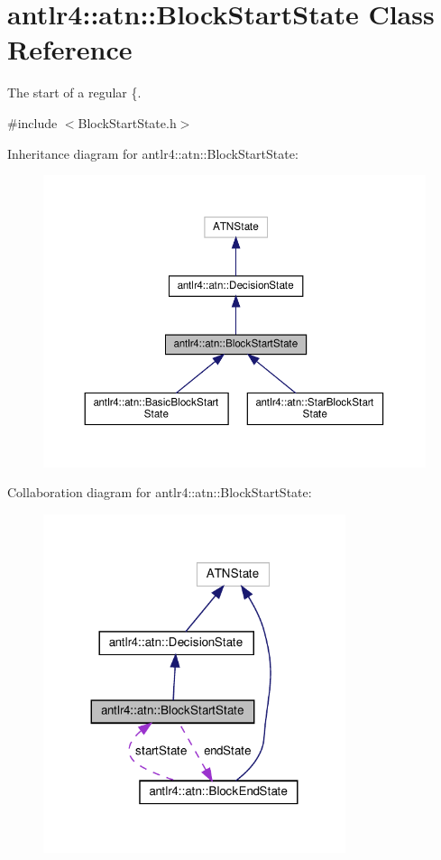 \hypertarget{classantlr4_1_1atn_1_1BlockStartState}{}\section{antlr4\+:\+:atn\+:\+:Block\+Start\+State Class Reference}
\label{classantlr4_1_1atn_1_1BlockStartState}


The start of a regular \{.  




{\ttfamily \#include $<$Block\+Start\+State.\+h$>$}



Inheritance diagram for antlr4\+:\+:atn\+:\+:Block\+Start\+State\+:
\nopagebreak
\begin{figure}[H]
\begin{center}
\leavevmode
\includegraphics[width=350pt]{classantlr4_1_1atn_1_1BlockStartState__inherit__graph}
\end{center}
\end{figure}


Collaboration diagram for antlr4\+:\+:atn\+:\+:Block\+Start\+State\+:
\nopagebreak
\begin{figure}[H]
\begin{center}
\leavevmode
\includegraphics[width=251pt]{classantlr4_1_1atn_1_1BlockStartState__coll__graph}
\end{center}
\end{figure}
